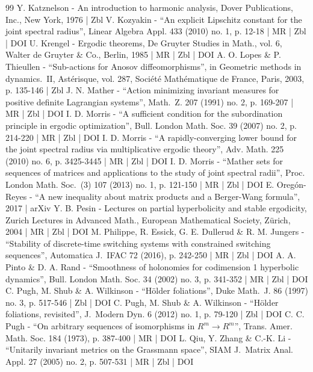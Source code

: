 \documentclass[10pt]{amsart}
\theoremstyle{plain}
\theoremstyle{definition}
\begin{document}
\begin{thebibliography}{99}
Y. Katznelson - An introduction to harmonic analysis, Dover Publications, Inc., New York, 1976 | Zbl
V. Kozyakin - “An explicit Lipschitz constant for the joint spectral radius”, Linear Algebra Appl. 433 (2010) no. 1, p. 12-18 | MR | Zbl | DOI
U. Krengel - Ergodic theorems, De Gruyter Studies in Math., vol. 6, Walter de Gruyter \& Co., Berlin, 1985 | MR | Zbl | DOI
A. O. Lopes \& P. Thieullen - “Sub-actions for Anosov diffeomorphisms”, in Geometric methods in dynamics. II, Astérisque, vol. 287, Société Mathématique de France, Paris, 2003, p. 135-146 | Zbl
J. N. Mather - “Action minimizing invariant measures for positive definite Lagrangian systems”, Math. Z. 207 (1991) no. 2, p. 169-207 | MR | Zbl | DOI
I. D. Morris - “A sufficient condition for the subordination principle in ergodic optimization”, Bull. London Math. Soc. 39 (2007) no. 2, p. 214-220 | MR | Zbl | DOI
I. D. Morris - “A rapidly-converging lower bound for the joint spectral radius via multiplicative ergodic theory”, Adv. Math. 225 (2010) no. 6, p. 3425-3445 | MR | Zbl | DOI
I. D. Morris - “Mather sets for sequences of matrices and applications to the study of joint spectral radii”, Proc. London Math. Soc. (3) 107 (2013) no. 1, p. 121-150 | MR | Zbl | DOI
E. Oregón-Reyes - “A new inequality about matrix products and a Berger-Wang formula”, 2017 | arXiv
Y. B. Pesin - Lectures on partial hyperbolicity and stable ergodicity, Zurich Lectures in Advanced Math., European Mathematical Society, Zürich, 2004 | MR | Zbl | DOI
M. Philippe, R. Essick, G. E. Dullerud \& R. M. Jungers - “Stability of discrete-time switching systems with constrained switching sequences”, Automatica J. IFAC 72 (2016), p. 242-250 | MR | Zbl | DOI
A. A. Pinto \& D. A. Rand - “Smoothness of holonomies for codimension 1 hyperbolic dynamics”, Bull. London Math. Soc. 34 (2002) no. 3, p. 341-352 | MR | Zbl | DOI
C. Pugh, M. Shub \& A. Wilkinson - “Hölder foliations”, Duke Math. J. 86 (1997) no. 3, p. 517-546 | Zbl | DOI
C. Pugh, M. Shub \& A. Wilkinson - “Hölder foliations, revisited”, J. Modern Dyn. 6 (2012) no. 1, p. 79-120 | Zbl | DOI
C. C. Pugh - “On arbitrary sequences of isomorphisms in $R^{m}\rightarrow R^{m}$”, Trans. Amer. Math. Soc. 184 (1973), p. 387-400 | MR | DOI
L. Qiu, Y. Zhang \& C.-K. Li - “Unitarily invariant metrics on the Grassmann space”, SIAM J. Matrix Anal. Appl. 27 (2005) no. 2, p. 507-531 | MR | Zbl | DOI

\end{thebibliography}
\end{document}
